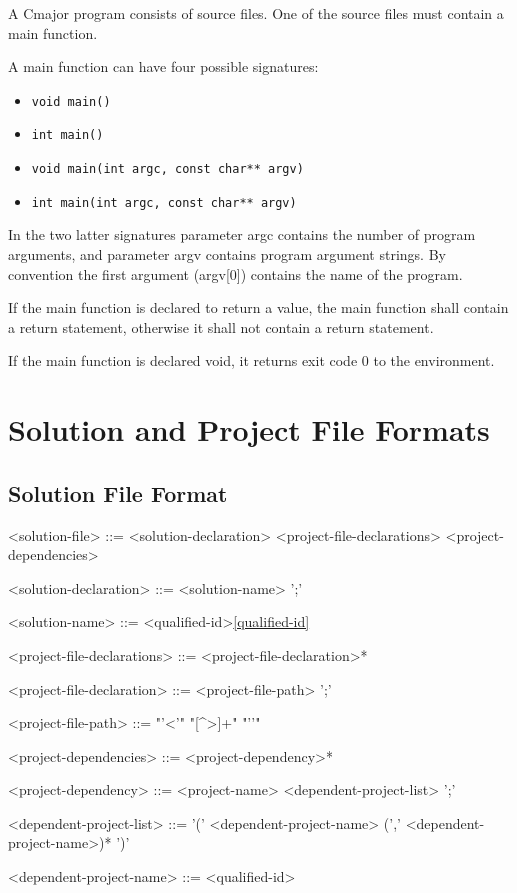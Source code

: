 \documentclass[a4paper,oneside,11pt]{article}
\begin{document}
A Cmajor program consists of source files.
One of the source files must contain a main function.

A main function can have four possible signatures:

\begin{itemize}
\item \texttt{void main()}
\item \texttt{int main()}
\item \texttt{void main(int argc, const char** argv)}
\item \texttt{int main(int argc, const char** argv)}
\end{itemize}

In the two latter signatures parameter argc contains the number of program arguments,
and parameter argv contains program argument strings.
By convention the first argument (argv[0]) contains the name of the program.

If the main function is declared to return a value, the main function shall contain
a return statement, otherwise it shall not contain a return statement.

If the main function is declared void, it returns exit code 0 to the environment.

\section{Solution and Project File Formats}

\subsection{Solution File Format}

\begin{grammar}
<solution-file> ::= <solution-declaration> <project-file-declarations> <project-dependencies>

<solution-declaration> ::=  <solution-name> ';'

<solution-name> ::= <qualified-id>\ref{qualified-id}

<project-file-declarations> ::= <project-file-declaration>*

<project-file-declaration> ::=  <project-file-path> ';'

<project-file-path> ::= "'<'" "[^>]+" "'\>'"

<project-dependencies> ::= <project-dependency>*

<project-dependency> ::=  <project-name> <dependent-project-list> ';'

<dependent-project-list> ::= '(' <dependent-project-name> (',' <dependent-project-name>)* ')'

<dependent-project-name> ::= <qualified-id>

\end{grammar}
\end{document}
